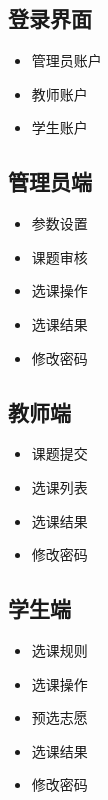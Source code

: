\subsection{登录界面}
\begin{itemize}
    \item 管理员账户
    \item 教师账户
    \item 学生账户
\end{itemize}

\subsection{管理员端}
\begin{itemize}
    \item 参数设置
    \item 课题审核
    \item 选课操作
    \item 选课结果
    \item 修改密码
\end{itemize}

\subsection{教师端}
\begin{itemize}
    \item 课题提交
    \item 选课列表
    \item 选课结果
    \item 修改密码
\end{itemize}

\subsection{学生端}
\begin{itemize}
    \item 选课规则
    \item 选课操作
    \item 预选志愿
    \item 选课结果
    \item 修改密码
\end{itemize}
